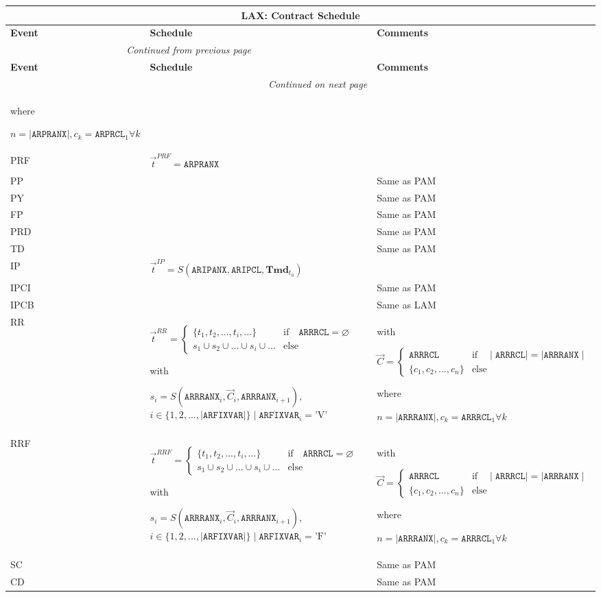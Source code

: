 \documentclass[9pt,oneside]{amsart}
\newenvironment{schedule}[1]{
	\begin{longtable}[H]{| p{0.05\textwidth} | p{0.5\textwidth} |  p{0.4\textwidth} |}
	\multicolumn{3}{c}{\textbf{#1: Contract Schedule}}\\
	\hline
	\textbf{Event} & \textbf{Schedule} & \textbf{Comments} \\
	\hline
	\endfirsthead
	\multicolumn{2}{c}{\textit{Continued from previous page}} \\
	\hline
	\textbf{Event} & \textbf{Schedule} & \textbf{Comments} \\
	\hline
	\endhead
	\hline \multicolumn{2}{r}{\textit{Continued on next page}} \\
	\endfoot
	\hline
	\endlastfoot
}{%
	\hline
	\end{longtable}
}
\newcommand{\svar}[2]{\textbf{#1}_{#2}}
\newcommand{\attr}[1]{\texttt{#1}}
\newcommand{\sdl}[3]{S(#1,#2,#3)}
\newcommand{\undef}{\varnothing}
\begin{document}
\begin{schedule}{LAX}
			where\par
			$n=\mid\attr{ARPRANX}\mid, c_k=\attr{ARPRCL}_1\forall k$ \\
	\hline
	PRF & $\vec{t}^{PRF} = \attr{ARPRANX}$ & \\
	\hline
	PP & & Same as PAM \\
	\hline
	PY & & Same as PAM \\
	\hline
	FP & & Same as PAM \\
	\hline
	PRD & & Same as PAM \\
	\hline
	TD & & Same as PAM \\
	\hline
	IP & $\vec{t}^{IP} = \sdl{\attr{ARIPANX}}{\attr{ARIPCL}}{\svar{Tmd}{t_0}}$ & \\
	\hline
	IPCI & & Same as PAM \\
  	\hline
	IPCB & & Same as LAM \\
	\hline
	RR & $\vec{t}^{RR} = \begin{cases} \{ t_1, t_2, ..., t_i, ... \} & \text{if}\quad \attr{ARRRCL}=\undef \\
					s_1 \cup s_2 \cup ... \cup s_i \cup ... & \text{else} \end{cases}$ \par
		with\par
		$s_i=\sdl{\attr{ARRRANX}_i}{\vec{C}_i}{\attr{ARRRANX}_{i+1}}$, $i\in\{1,2,...,\mid\attr{ARFIXVAR}\mid\} \mid \attr{ARFIXVAR}_i = \text{'V'}$
		& with\par $\vec{C} = \begin{cases} \attr{ARRRCL} & \text{if} \quad \mid\attr{ARRRCL}\mid = \mid \attr{ARRRANX}\mid \\
				   \{ c_1, c_2, ..., c_n \}  & \text{else} \end{cases}$ \par
			where\par
			$n=\mid\attr{ARRRANX}\mid, c_k=\attr{ARRRCL}_1\forall k$ \\
	\hline
	RRF & $\vec{t}^{RRF} = \begin{cases} \{ t_1, t_2, ..., t_i, ... \} & \text{if}\quad \attr{ARRRCL}=\undef \\
					s_1 \cup s_2 \cup ... \cup s_i \cup ... & \text{else} \end{cases}$ \par
		with\par
		$s_i=\sdl{\attr{ARRRANX}_i}{\vec{C}_i}{\attr{ARRRANX}_{i+1}}$, $i\in\{1,2,...,\mid\attr{ARFIXVAR}\mid\} \mid \attr{ARFIXVAR}_i = \text{'F'}$
		& with\par $\vec{C} = \begin{cases} \attr{ARRRCL} & \text{if} \quad \mid\attr{ARRRCL}\mid = \mid \attr{ARRRANX}\mid \\
				   \{ c_1, c_2, ..., c_n \}  & \text{else} \end{cases}$ \par
			where\par
			$n=\mid\attr{ARRRANX}\mid, c_k=\attr{ARRRCL}_1\forall k$ \\
	\hline
	SC & & Same as PAM \\
	\hline
	CD & & Same as PAM \\
\end{schedule}
\end{document}

